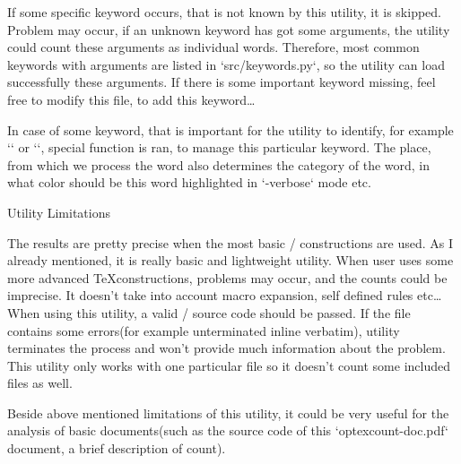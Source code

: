 If some specific keyword occurs, that is not known by this utility, it is skipped. Problem may occur, if an unknown keyword has got some arguments, the utility could count these arguments as individual words. Therefore, most common keywords with arguments are listed in `src/keywords.py`, so the utility can load successfully these arguments. If there is some important keyword missing, feel free to modify this file, to add this keyword\dots

In case of some keyword, that is important for the utility to identify, for example {\Blue `\sec`} or {\Blue `\fnote`}, special function is ran, to manage this particular keyword. The place, from which we process the word also determines the category of the word, in what color should be this word highlighted in {\Blue `-verbose`} mode etc.


\sec Utility Limitations

The results are pretty precise when the most basic \OpTeX/ constructions are used. As I already mentioned, it is really basic and lightweight utility. When user uses some more advanced \TeX constructions, problems may occur, and the counts could be imprecise. It doesn't take into account macro expansion, self defined rules etc\dots When using this utility, a valid \OpTeX/ source code should be passed. If the file contains some errors(for example unterminated inline verbatim), utility terminates the process and won't provide much information about the problem. This utility only works with one particular file so it doesn't count some included files as well.

Beside above mentioned limitations of this utility, it could be very useful for the analysis of basic \OpTeX documents(such as the source code of this {\Blue `optexcount-doc.pdf`} document, a brief description of \OpTeX count).

\bye
